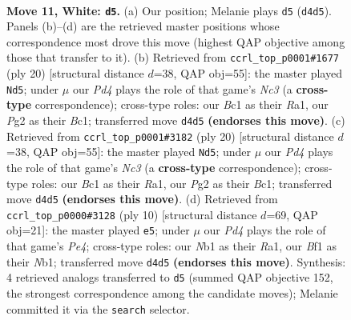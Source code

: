 \documentclass[11pt]{article}
\begin{document}
\begin{figure}[p]\centering
\begin{subfigure}{0.46\textwidth}\centering
\resizebox{\linewidth}{!}{%
\newchessgame
\chessboard[
  setfen={r1bqr1k1/pppp1ppp/3n1b2/8/3P4/8/PPP2PPP/RNBQRBK1 w - - 3 11},
  showmover=false,
  pgfstyle=straightmove, color=movearrow, markmove={d4-d5}
]}
\caption{}
\end{subfigure}\hfill
\begin{subfigure}{0.46\textwidth}\centering
\resizebox{\linewidth}{!}{%
\newchessgame
\chessboard[
  setfen={r1bqr1k1/pppp1ppp/3n1b2/8/8/2N5/PPPP1PPP/R1BQRBK1 w - - 5 11},
  showmover=false,
  pgfstyle=straightmove, color=movearrow, markmove={c3-d5}
]}
\caption{}
\end{subfigure}
\\[4pt]
\begin{subfigure}{0.46\textwidth}\centering
\resizebox{\linewidth}{!}{%
\newchessgame
\chessboard[
  setfen={r1bqr1k1/pppp1ppp/3n1b2/8/8/2N5/PPPP1PPP/R1BQRBK1 w - - 5 11},
  showmover=false,
  pgfstyle=straightmove, color=movearrow, markmove={c3-d5}
]}
\caption{}
\end{subfigure}\hfill
\begin{subfigure}{0.46\textwidth}\centering
\resizebox{\linewidth}{!}{%
\newchessgame
\chessboard[
  setfen={r1bqkb1r/p1pp1ppp/2p2n2/8/4P3/8/PPP2PPP/RNBQKB1R w KQkq - 0 6},
  showmover=false,
  pgfstyle=straightmove, color=movearrow, markmove={e4-e5}
]}
\caption{}
\end{subfigure}
\caption{\textbf{Move 11, White: \texttt{d5}.} (a) Our position; Melanie plays \texttt{d5} (\texttt{d4d5}). Panels (b)--(d) are the retrieved master positions whose correspondence most drove this move (highest QAP objective among those that transfer to it). (b) Retrieved from \texttt{ccrl\_top\_p0001\#1677} (ply 20) [structural distance $d$=38, QAP obj=55]: the master played \texttt{Nd5}; under $\mu$ our \emph{Pd4} plays the role of that game's \emph{Nc3} (a \textbf{cross-type} correspondence); cross-type roles: our \emph{B}c1 as their \emph{R}a1, our \emph{P}g2 as their \emph{B}c1; transferred move \texttt{d4d5} \textbf{(endorses this move)}. (c) Retrieved from \texttt{ccrl\_top\_p0001\#3182} (ply 20) [structural distance $d$=38, QAP obj=55]: the master played \texttt{Nd5}; under $\mu$ our \emph{Pd4} plays the role of that game's \emph{Nc3} (a \textbf{cross-type} correspondence); cross-type roles: our \emph{B}c1 as their \emph{R}a1, our \emph{P}g2 as their \emph{B}c1; transferred move \texttt{d4d5} \textbf{(endorses this move)}. (d) Retrieved from \texttt{ccrl\_top\_p0000\#3128} (ply 10) [structural distance $d$=69, QAP obj=21]: the master played \texttt{e5}; under $\mu$ our \emph{Pd4} plays the role of that game's \emph{Pe4}; cross-type roles: our \emph{N}b1 as their \emph{R}a1, our \emph{B}f1 as their \emph{N}b1; transferred move \texttt{d4d5} \textbf{(endorses this move)}. Synthesis: 4 retrieved analogs transferred to \texttt{d5} (summed QAP objective 152, the strongest correspondence among the candidate moves); Melanie committed it via the \texttt{search} selector.}
\label{fig:thought-m20}
\end{figure}
\end{document}
